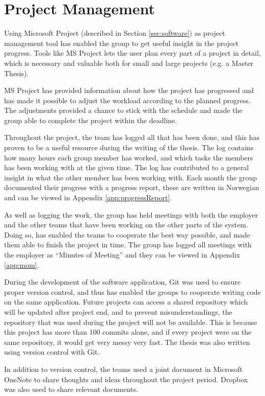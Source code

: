 \chapter{Project Management}
\label{cha:projectmanagement}
Using Microsoft Project (described in Section \ref{sec:software}) as project management tool has enabled the group to get useful insight in the project progress. Tools like MS Project lets the user plan every part of a project in detail, which is necessary and valuable both for small and large projects (e.g. a Master Thesis).

MS Project has provided information about how the project has progressed and has made it possible to adjust the workload according to the planned progress. The adjustments provided a chance to stick with the schedule and made the group able to complete the project within the deadline.

Throughout the project, the team has logged all that has been done, and this has proven to be a useful resource during the writing of the thesis. The log contains how many hours each group member has worked, and which tasks the members has been working with at the given time. The log has contributed to a general insight in what the other member has been working with. Each month the group documented their progress with a progress report, these are written in Norwegian and can be viewed in Appendix \ref{app:progressReport}.

As well as logging the work, the group has held meetings with both the employer and the other teams that have been working on the other parts of the system. Doing so, has enabled the teams to cooperate the best way possible, and made them able to finish the project in time. The group has logged all meetings with the employer as ``Minutes of Meeting'' and they can be viewed in Appendix \ref{app:mom}.

During the development of the software application, Git was used to ensure proper version control, and thus has enabled the groups to cooperate writing code on the same application. Future projects can access a shared repository which will be updated after project end, and to prevent misunderstandings, the repository that was used during the project will not be available. This is because this project has more than 100 commits alone, and if every project were on the same repository, it would get very messy very fast. The thesis was also written using version control with Git.

In addition to version control, the teams used a joint document in Microsoft OneNote to share thoughts and ideas throughout the project period. Dropbox was also used to share relevant documents.
